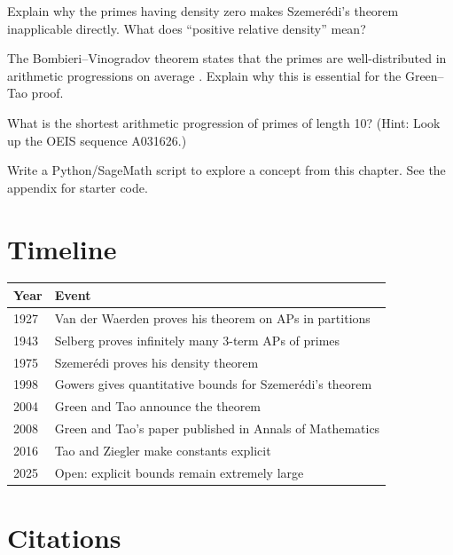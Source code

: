 \begin{exercise}[Intermediate]
Explain why the primes having density zero makes Szemer\'edi's theorem inapplicable directly. What does ``positive relative density'' mean?
\end{exercise}

\begin{exercise}[Challenge]
The Bombieri--Vinogradov theorem states that the primes are well-distributed in arithmetic progressions on average \cite{bombieri1965}. Explain why this is essential for the Green--Tao proof.
\end{exercise}

\begin{exercise}
What is the shortest arithmetic progression of primes of length 10? (Hint: Look up the OEIS sequence A031626.)
\end{exercise}


\begin{exercise}[Computational]
Write a Python/SageMath script to explore a concept from this chapter. See the appendix for starter code.
\end{exercise}

\section{Timeline}

\begin{tabularx}{\linewidth}{lX}
\toprule
\textbf{Year} & \textbf{Event} \\ \midrule
1927 & Van der Waerden proves his theorem on APs in partitions \cite{vdW1927} \\ 
1943 & Selberg proves infinitely many 3-term APs of primes \cite{selberg1943} \\ 
1975 & Szemer\'edi proves his density theorem \cite{szemeredi1975} \\ 
1998 & Gowers gives quantitative bounds for Szemer\'edi's theorem \cite{gowers2001} \\ 
2004 & Green and Tao announce the theorem \cite{greentao2008} \\ 
2008 & Green and Tao's paper published in Annals of Mathematics \\ 
2016 & Tao and Ziegler make constants explicit \cite{tao2016} \\ 
2025 & Open: explicit bounds remain extremely large \\ \bottomrule
\end{tabularx}

\section{Citations}

